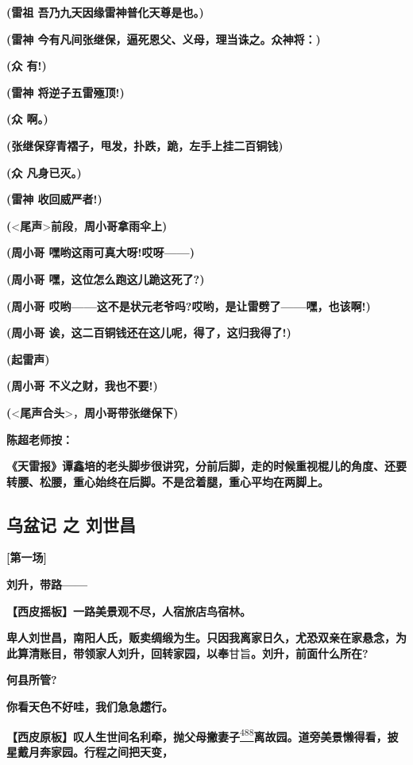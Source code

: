 \textbf{(雷祖 吾乃九天因缘雷神普化天尊是也。)}

\textbf{(雷神 今有凡间张继保，逼死恩父、义母，理当诛之。众神将：)}

\textbf{(众 有!)}

\textbf{(雷神 将逆子五雷殛顶!)}

\textbf{(众 啊。)}

\textbf{(张继保穿青褶子，甩发，扑跌，跪，左手上挂二百铜钱)}

\textbf{(众 凡身已灭。)}

\textbf{(雷神 收回威严者!)}

\textbf{(}\textless{}\textbf{尾声}\textgreater{}\textbf{前段}，\textbf{周小哥拿雨伞上)}

\textbf{(周小哥 嘿哟这雨可真大呀!哎呀------)}

\textbf{(周小哥 嘿，这位怎么跑这儿跪这死了?)}

\textbf{(周小哥
哎哟------这不是状元老爷吗?哎哟，是让雷劈了------嘿，也该啊!)}

\textbf{(周小哥 诶，这二百铜钱还在这儿呢，得了，这归我得了!)}

\textbf{(起雷声)}

\textbf{(周小哥 不义之财，我也不要!)}

\textbf{(}\textless{}\textbf{尾声合头}\textgreater{}，\textbf{周小哥带张继保下)}

\textbf{陈超老师按：}

\textbf{《天雷报》谭鑫培的老头脚步很讲究，分前后脚，走的时候重视棍儿的角度、还要转腰、松腰，重心始终在后脚。不是岔着腿，重心平均在两脚上。}

\hypertarget{ux4e4cux76c6ux8bb0-ux4e4b-ux5218ux4e16ux660c}{%
\subsection{乌盆记 之
刘世昌}\label{ux4e4cux76c6ux8bb0-ux4e4b-ux5218ux4e16ux660c}}

\textbf{{[}第一场{]}}

\textbf{刘升，带路------}

\textbf{【西皮摇板】一路美景观不尽，人宿旅店鸟宿林。}

\textbf{卑人刘世昌，南阳人氏，贩卖绸缎为生。只因我离家日久，尤恐双亲在家悬念，为此算清账目，带领家人刘升，回转家园，以奉}甘旨\textbf{。刘升，前面什么所在?}

\textbf{何县所管?}

\textbf{你看天色不好哇，我们急急趱行。}

\textbf{【西皮原板】叹人生世间名利牵，抛父母撇妻子}\protect\hyperlink{fn488}{\textsuperscript{488}}\textbf{离故园。道旁美景懒得看，披星戴月奔家园。行程之间把天变，}

